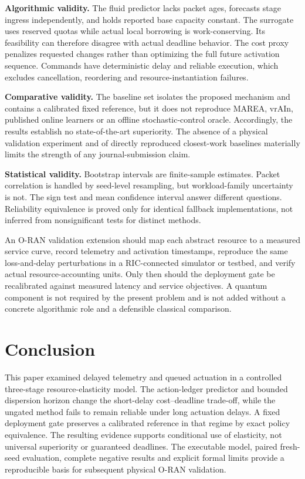 \documentclass[10pt,a4paper]{article}
\begin{document}
\textbf{Algorithmic validity.} The fluid predictor lacks packet ages, forecasts
stage ingress independently, and holds reported base capacity constant. The
surrogate uses reserved quotas while actual local borrowing is work-conserving.
Its feasibility can therefore disagree with actual deadline behavior. The
cost proxy penalizes requested changes rather than optimizing the full future
activation sequence. Commands have deterministic delay and reliable execution,
which excludes cancellation, reordering and resource-instantiation failures.

\textbf{Comparative validity.} The baseline set isolates the proposed mechanism
and contains a calibrated fixed reference, but it does not reproduce MAREA,
vrAIn, published online learners or an offline stochastic-control oracle.
Accordingly, the results establish no state-of-the-art superiority. The absence
of a physical validation experiment and of directly reproduced closest-work
baselines materially limits the strength of any journal-submission claim.

\textbf{Statistical validity.} Bootstrap intervals are finite-sample estimates.
Packet correlation is handled by seed-level resampling, but workload-family
uncertainty is not. The sign test and mean confidence interval answer different
questions. Reliability equivalence is proved only for identical fallback
implementations, not inferred from nonsignificant tests for distinct methods.

An O-RAN validation extension should map each abstract resource to a measured
service curve, record telemetry and activation timestamps, reproduce the same
loss-and-delay perturbations in a RIC-connected simulator or testbed, and verify
actual resource-accounting units. Only then should the deployment gate be
recalibrated against measured latency and service objectives. A quantum component
is not required by the present problem and is not added without a concrete
algorithmic role and a defensible classical comparison.

\section{Conclusion}
This paper examined delayed telemetry and queued actuation in a controlled
three-stage resource-elasticity model. The action-ledger predictor and bounded
dispersion horizon change the short-delay cost--deadline trade-off, while the
ungated method fails to remain reliable under long actuation delays. A fixed
deployment gate preserves a calibrated reference in that regime by exact
policy equivalence. The resulting evidence supports conditional use of
elasticity, not universal superiority or guaranteed deadlines. The executable
model, paired fresh-seed evaluation, complete negative results and explicit
formal limits provide a reproducible basis for subsequent physical O-RAN
validation.
\end{document}
